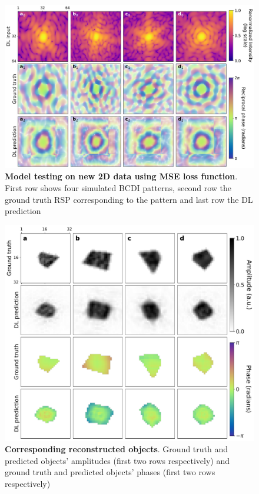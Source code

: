 \begin{figure}[H]
    \centering
    \includegraphics[width=.8\textwidth]{figures/Phasing/RSP_low_strain_doubleMSE.pdf}
    \caption{\textbf{Model testing on new 2D data using MSE loss function}. First row shows four simulated BCDI patterns, second row the ground truth RSP 
    corresponding to the pattern and last row the DL prediction }
    \label{fig:RSP_lowStrain_doubleMSE}
\end{figure}
\begin{figure}[H]
    \centering
    \includegraphics[width=.8\textwidth]{figures/Phasing/obj_low_strain_doubleMSE.pdf}
    \caption{\textbf{Corresponding reconstructed objects}. Ground truth and predicted objects' amplitudes (first two rows 
    respectively) and ground truth and predicted objects' phases (first two rows respectively)}
    \label{fig:obj_lowStrain_doubleMSE}
\end{figure}


